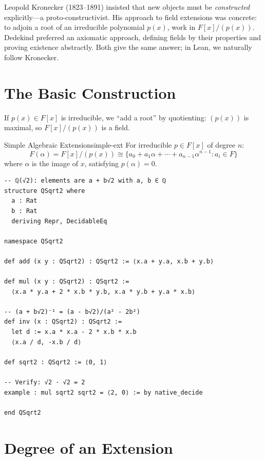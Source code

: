 \documentclass[11pt, a4paper, oneside]{book}
\newcommand{\iso}{\cong}
\begin{document}
\begin{historical}[title={Kronecker vs.\ Dedekind}]
Leopold Kronecker (1823--1891) insisted that new objects must be
\emph{constructed} explicitly---a proto-constructivist. His approach to field
extensions was concrete: to adjoin a root of an irreducible polynomial $p(x)$,
work in $F[x]/(p(x))$. Dedekind preferred an axiomatic approach, defining
fields by their properties and proving existence abstractly. Both give the
same answer; in Lean, we naturally follow Kronecker.
\end{historical}

\section{The Basic Construction}

If $p(x) \in F[x]$ is irreducible, we ``add a root'' by quotienting:
$(p(x))$ is maximal, so $F[x]/(p(x))$ is a field.

\begin{defn}{Simple Algebraic Extension}{simple-ext}
For irreducible $p \in F[x]$ of degree $n$:
\[
  F(\alpha) = F[x]/(p(x)) \iso
  \{a_0 + a_1\alpha + \cdots + a_{n-1}\alpha^{n-1} : a_i \in F\}
\]
where $\alpha$ is the image of $x$, satisfying $p(\alpha) = 0$.
\end{defn}

\begin{leanbox}
\begin{verbatim}
-- ℚ(√2): elements are a + b√2 with a, b ∈ ℚ
structure QSqrt2 where
  a : Rat
  b : Rat
  deriving Repr, DecidableEq

namespace QSqrt2

def add (x y : QSqrt2) : QSqrt2 := ⟨x.a + y.a, x.b + y.b⟩

def mul (x y : QSqrt2) : QSqrt2 :=
  ⟨x.a * y.a + 2 * x.b * y.b, x.a * y.b + y.a * x.b⟩

-- (a + b√2)⁻¹ = (a - b√2)/(a² - 2b²)
def inv (x : QSqrt2) : QSqrt2 :=
  let d := x.a * x.a - 2 * x.b * x.b
  ⟨x.a / d, -x.b / d⟩

def sqrt2 : QSqrt2 := ⟨0, 1⟩

-- Verify: √2 · √2 = 2
example : mul sqrt2 sqrt2 = ⟨2, 0⟩ := by native_decide

end QSqrt2
\end{verbatim}
\end{leanbox}

\section{Degree of an Extension}
\end{document}
